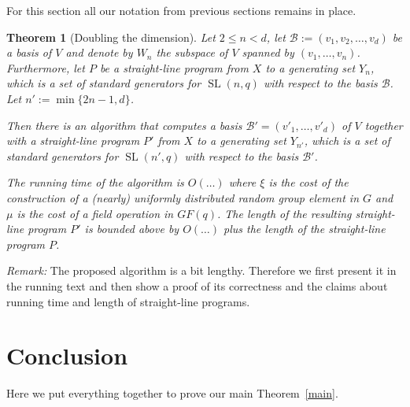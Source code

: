 \documentclass[a4paper,11pt]{article}
\def\SL{\operatorname{SL}}
\newcommand{\B}{\mathcal{B}}
\newtheorem{theorem}{Theorem}
\begin{document}
For this section all our notation from previous sections remains in place.

\begin{theorem}[Doubling the dimension]
\label{double}
Let $2 \le n < d$, let $\B := (v_1, v_2, \ldots, v_d)$ be a basis of $V$
and denote by $W_n$ the subspace of $V$ spanned by $(v_1, \ldots, v_n)$. 
Furthermore, let $P$ be a straight-line program
from $X$ to a generating set $Y_n$, which is a set of standard
generators for $\SL(n,q)$ with respect to the basis $\B$.
Let $n' := \min\{ 2n-1, d\}$.

Then there is an algorithm that computes a basis $\B' = (v'_1, \ldots,
v'_d)$ of $V$ together with a straight-line program $P'$ from $X$
to a generating set $Y_{n'}$, which is a set of standard generators
for $\SL(n',q)$ with respect to the basis $\B'$.

The running time of the algorithm is $O(\ldots)$ where $\xi$ is the
cost of the construction of a (nearly) uniformly distributed random
group element in $G$ and $\mu$ is the cost of a field operation in
$GF(q)$. The length of the resulting straight-line program $P'$ is
bounded above by $O(\ldots)$ plus the length of the straight-line
program $P$.
\end{theorem}

\emph{Remark:} The proposed algorithm is a bit lengthy. Therefore
we first present it in the running text and then show a proof of its
correctness and the claims about running time and length of
straight-line programs.


\section{Conclusion}

Here we put everything together to prove our main Theorem~\ref{main}.
\end{document}
